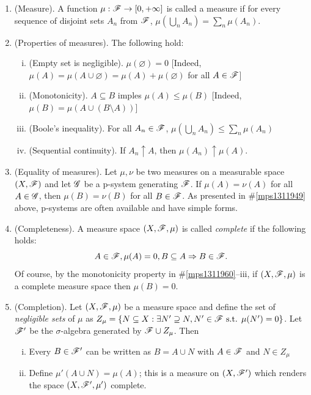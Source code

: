 \documentclass[a4paper,10pt]{article}
\begin{document}
\begin{enumerate}
 \item (Measure). A function $\mu: \mathscr{F}\to [0,+\infty]$ is called a measure if 
       for every sequence of disjoint sets $A_n$ from $\mathscr{F}$, $\mu(\bigcup_n A_n)= \sum_n \mu(A_n)$.

 \item \label{mps1311960}
      (Properties of measures). The following hold:
      \begin{enumerate}[i.]
       \item (Empty set is negligible). $\mu(\varnothing)=0$ [Indeed, $\mu(A) = \mu(A\cup \varnothing) = \mu(A) + \mu(\varnothing)$ for all $A\in\mathscr{F}$]
       \item (Monotonicity). $A\subseteq B$ imples $\mu(A) \leq \mu(B)$ [Indeed, $\mu(B) = \mu(A\cup (B\setminus A))$]
       \item (Boole's inequality). For all $A_n\in\mathscr{F}$, $\mu(\bigcup_n A_n) \leq \sum_n \mu(A_n)$
       \item (Sequential continuity). If $A_n\uparrow A$, then $\mu(A_n)\uparrow \mu(A)$.
      \end{enumerate}

 \item (Equality of measures). Let $\mu,\nu$ be two measures on a measurable space $(X,\mathscr{F})$ and let $\mathscr{G}$ 
       be a p-system generating $\mathscr{F}$. If $\mu(A) = \nu(A)$ for all $A\in \mathscr{G}$, then $\mu(B) = \nu(B)$
       for all $B\in\mathscr{F}$. As presented in \#\ref{mps1311949} above, p-systems are often available and 
       have simple forms.
      
 \item (Completeness). A measure space $(X,\mathscr{F},\mu)$ is called \textit{complete} if the following holds:
	\[
	    A \in \mathscr{F}, \mu(A)=0, B\subseteq A \Rightarrow B \in \mathscr{F}.
	\]
       Of course, by the monotonicity property in \#\ref{mps1311960}--iii, if $(X,\mathscr{F},\mu)$ is a complete 
       measure space then $\mu(B) = 0$.
       
 \item (Completion). Let $(X,\mathscr{F},\mu)$ be a measure space and define the set of \textit{negligible sets} of $\mu$ as 
       $Z_\mu = \{N \subseteq X: \exists N'\supseteq N, N'\in\mathscr{F} \text{ s.t. } \mu(N')=0\}$.
       Let $\mathscr{F}'$ be the $\sigma$-algebra generated by $\mathscr{F}\cup Z_\mu$. Then
       \begin{enumerate}[i.]
        \item Every $B\in\mathscr{F}'$ can be written as $B=A\cup N$ with $A\in\mathscr{F}$ and $N\in Z_\mu$
        \item Define $\mu'(A\cup N) = \mu(A)$; this is a measure on $(X,\mathscr{F}')$ which renders 
              the space $(X,\mathscr{F}',\mu')$ complete. 
       \end{enumerate}
 

\end{enumerate}
\end{document}
